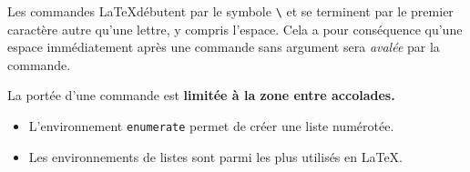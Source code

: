 \documentclass[12pt,french]{article}
\begin{document}
Les commandes \LaTeX débutent par le symbole \verb=\= et se
terminent par le premier caractère autre qu'une lettre, y compris
l'espace. Cela a pour conséquence qu'une espace immédiatement après
une commande sans argument sera \emph{avalée} par la commande.

La portée d'une commande est \bfseries limitée à la zone entre accolades.

\begin{itemize}
\item L'environnement \texttt{enumerate} permet de créer une liste
  numérotée.
\item Les environnements de listes sont parmi les plus utilisés en
  \LaTeX.
\end{itemize}
\end{document}
